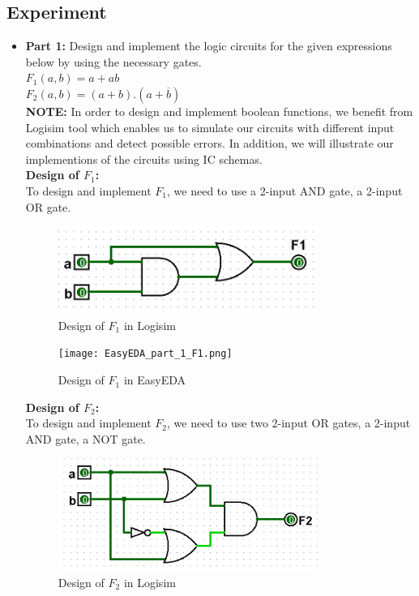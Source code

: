 \documentclass[pdftex,12pt,a4paper]{article}
\begin{document}
\subsection{Experiment}
\begin{itemize}
    \item \textbf{Part 1:} Design and implement the logic circuits for the given expressions below by using the necessary gates.\\
    $F_1 (a, b) = a + ab$ \\
    $F_2 (a, b) = (a + b) . (a + \overline{b})$\\

    \textbf{NOTE:} In order to design and implement boolean functions, we benefit from Logisim tool which enables us to simulate our circuits with different input combinations and detect possible errors. In addition, we will illustrate our implementions of the circuits using IC schemas.\\
    
    \textbf{Design of $F_1$:}\\
    To design and implement $F_1$, we need to use a 2-input AND gate, a 2-input OR gate.\\

    \begin{figure}[H]
    \centering
        \includegraphics[width=0.8\textwidth]{F1.png}	
        \caption{Design of \textbf{$F_1$} in Logisim}
   \end{figure}
   
   \begin{figure}[H]
    \centering
        \texttt{[image: EasyEDA\_part\_1\_F1.png]}	
        \caption{Design of \textbf{$F_1$} in EasyEDA}
   \end{figure}
   
   \textbf{Design of $F_2$:} \\ 
    To design and implement $F_2$, we need to use two 2-input OR gates, a 2-input AND gate, a NOT gate.\\

    \begin{figure}[H]
    \centering
        \includegraphics[width=0.8\textwidth]{F2.png}	
        \caption{Design of \textbf{$F_2$} in Logisim}
   \end{figure}
   

\end{itemize}
\end{document}
